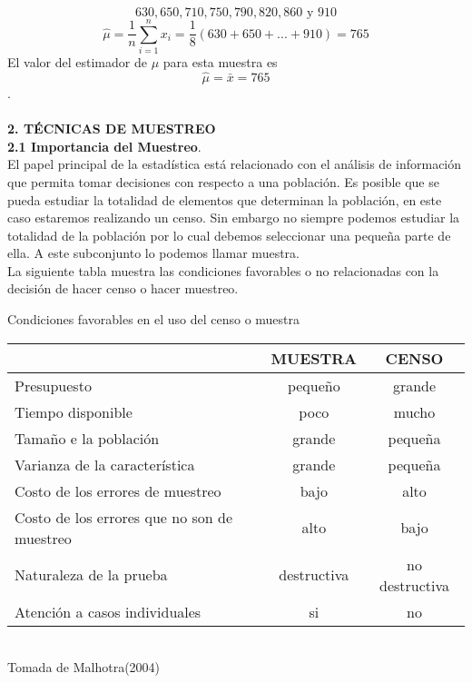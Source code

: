 \documentclass[base=hide,11pt]{elegantbook}
\begin{document}
	$$ 630, 650, 710, 750, 790, 820, 860 \text{ y } 910$$
	$$\widehat{\mu}=\frac{1}{n}\sum_{i=1}^{n} x_{i} =\frac{1}{8}(630+650+...+910)=765$$
	El valor del estimador de $\mu$ para esta muestra es $$\widehat{\mu}=\bar{x}= 765$$.  \\ \\
\textcolor{col4}{\bf \LARGE 2. TÉCNICAS DE MUESTREO}\\



\textcolor{col4}{\bf \large 2.1 Importancia del Muestreo}.\\
El papel principal de la estadística está relacionado con el análisis de información que permita tomar decisiones con respecto a una población. Es posible que se pueda estudiar la totalidad de elementos  que determinan la población, en este caso estaremos realizando un censo. Sin embargo no siempre podemos estudiar la totalidad de la población por lo cual debemos seleccionar una pequeña parte de ella. A este subconjunto lo podemos llamar muestra.\\
La siguiente tabla muestra las condiciones favorables o no relacionadas con la decisión de hacer censo o hacer muestreo.\\


\begin{center}
	Condiciones favorables en el uso del censo o muestra \\
\begin{tabular}{lcc}
\hline 
& MUESTRA & CENSO \\
\hline 
Presupuesto                                  & pequeño       & grande \\
Tiempo disponible                            & poco          & mucho  \\
Tamaño e la población                        & grande        & pequeña \\
Varianza de la característica                & grande        & pequeña \\
Costo de los errores de muestreo             & bajo          & alto  \\
Costo de los errores que no son de muestreo  & alto          & bajo  \\
Naturaleza de la prueba                      & destructiva   & no destructiva \\
Atención a casos individuales                & si            & no \\
\hline
\end{tabular}	\\
{\small Tomada de Malhotra(2004) }\\
\end{center}
	
\end{document}

